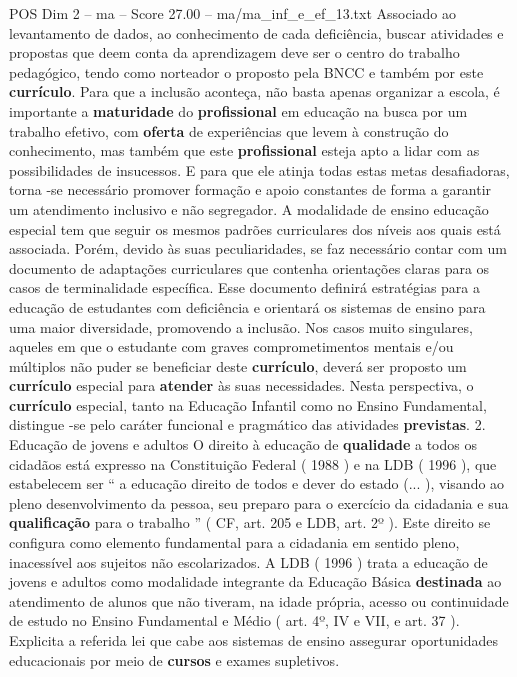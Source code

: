 \begin{textsample}{POS Dim 2 – ma – Score 27.00 – ma/ma\_inf\_e\_ef\_13.txt}
Associado ao levantamento de dados, ao conhecimento de cada deficiência, buscar atividades e propostas que deem conta da aprendizagem deve ser o centro do trabalho pedagógico, tendo como norteador o proposto pela BNCC e também por este \textbf{currículo}.
Para que a inclusão aconteça, não basta apenas organizar a escola, é importante a \textbf{maturidade} do \textbf{profissional} em educação na busca por um trabalho efetivo, com \textbf{oferta} de experiências que levem à construção do conhecimento, mas também que este \textbf{profissional} esteja apto a lidar com as possibilidades de insucessos.
E para que ele atinja todas estas metas desafiadoras, torna -se necessário promover formação e apoio constantes de forma a garantir um atendimento inclusivo e não segregador.
A modalidade de ensino educação especial tem que seguir os mesmos padrões curriculares dos níveis aos quais está associada.
Porém, devido às suas peculiaridades, se faz necessário contar com um documento de adaptações curriculares que contenha orientações claras para os casos de terminalidade específica.
Esse documento definirá estratégias para a educação de estudantes com deficiência e orientará os sistemas de ensino para uma maior diversidade, promovendo a inclusão.
Nos casos muito singulares, aqueles em que o estudante com graves comprometimentos mentais e/ou múltiplos não puder se beneficiar deste \textbf{currículo}, deverá ser proposto um \textbf{currículo} especial para \textbf{atender} às suas necessidades.
Nesta perspectiva, o \textbf{currículo} especial, tanto na Educação Infantil como no Ensino Fundamental, distingue -se pelo caráter funcional e pragmático das atividades \textbf{previstas}. 2.
Educação de jovens e adultos O direito à educação de \textbf{qualidade} a todos os cidadãos está expresso na Constituição Federal ( 1988 ) e na LDB ( 1996 ), que estabelecem ser “ a educação direito de todos e dever do estado (... ), visando ao pleno desenvolvimento da pessoa, seu preparo para o exercício da cidadania e sua \textbf{qualificação} para o trabalho ” ( CF, art. 205 e LDB, art. 2º ).
Este direito se configura como elemento fundamental para a cidadania em sentido pleno, inacessível aos sujeitos não escolarizados.
A LDB ( 1996 ) trata a educação de jovens e adultos como modalidade integrante da Educação Básica \textbf{destinada} ao atendimento de alunos que não tiveram, na idade própria, acesso ou continuidade de estudo no Ensino Fundamental e Médio ( art. 4º, IV e VII, e art. 37 ).
Explicita a referida lei que cabe aos sistemas de ensino assegurar oportunidades educacionais por meio de \textbf{cursos} e exames supletivos.

\end{textsample}
